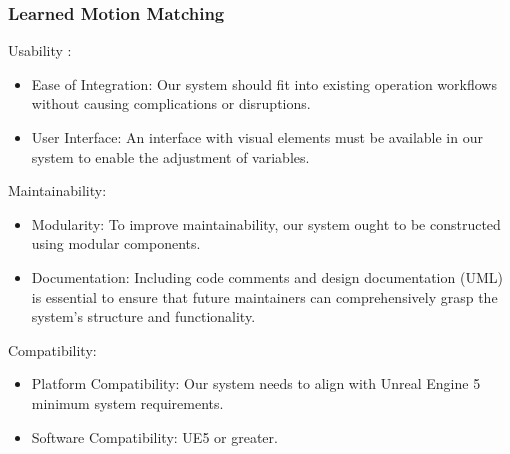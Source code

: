 \documentclass[12pt]{book}
\begin{document}
\subsubsection{Learned Motion Matching}
\begin{list}{-}{}   
    \item Usability : \begin{itemize}
        \item Ease of Integration: Our system should fit into existing operation workflows without causing complications or disruptions.
        \item User Interface: An interface with visual elements must be available in our system to enable the adjustment of variables.
    \end{itemize}
  
    \item Maintainability: \begin{itemize}
        \item Modularity: To improve maintainability, our system ought to be constructed using modular components.
        \item  Documentation: Including code comments and design documentation (UML) is essential to ensure that future maintainers can comprehensively grasp the system's structure and functionality.
    \end{itemize}
\item Compatibility: \begin{itemize}
    \item Platform Compatibility: Our system needs to align with Unreal Engine 5 minimum system requirements.
    \item Software Compatibility: UE5 or greater.
\end{itemize}
\end{list} 
\end{document}
